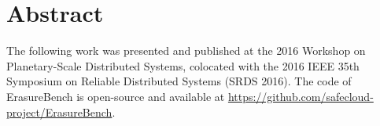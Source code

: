 \documentclass[10pt,conference]{IEEEtran}
\begin{document}
\begin{titlepage}
\begin{otherlanguage}{australian}
\begin{center}
            \begin{figure}[htp]
                \centering
                \hfill
                \hfill
            \end{figure}

        \end{center}

\pagebreak

\section*{Abstract}

\noindent 

The following work was presented and published at the 2016 Workshop on Planetary-Scale Distributed Systems, colocated with the 2016 IEEE 35th Symposium on Reliable Distributed Systems (SRDS 2016). The code of ErasureBench is open-source and available at \url{https://github.com/safecloud-project/ErasureBench}.


\end{otherlanguage}
\end{titlepage}
\end{document}
